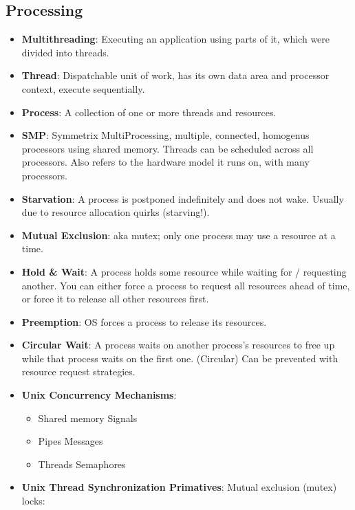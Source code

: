 \documentclass[fontsize=5pt]{scrartcl}
\begin{document}
\begin{multicols}{3}
     \subsection{Processing}
      \begin{itemize}       
       \item \textbf{Multithreading}: Executing an application using parts of it, which were divided into threads. 
       \item \textbf{Thread}: Dispatchable unit of work, has its own data area and processor context, execute sequentially.
       \item \textbf{Process}: A collection of one or more threads and resources.
       \item \textbf{SMP}: Symmetrix MultiProcessing, multiple, connected, homogenus processors using shared memory.
                           Threads can be scheduled across all processors. Also refers to the hardware model it runs on, with
                           many processors.
        \item \textbf{Starvation}: A process is postponed indefinitely and does not wake. Usually due to resource allocation quirks (starving!).
        \item \textbf{Mutual Exclusion}: aka mutex; only one process may use a resource at a time.
        \item \textbf{Hold \& Wait}: A process holds some resource while waiting for / requesting another. You can either force a process to request all resources ahead of time,
                                    or force it to release all other resources first.
        \item \textbf{Preemption}: OS forces a process to release its resources. 
        \item \textbf{Circular Wait}: A process waits on another process's resources to free up while that process waits on the first one. (Circular)
                                      Can be prevented with resource request strategies.
        \item \textbf{Unix Concurrency Mechanisms}:
        \begin{itemize}
          \item Shared memory   Signals
          \item Pipes           Messages
          \item Threads         Semaphores
        \end{itemize}
        \item \textbf{Unix Thread Synchronization Primatives}: Mutual exclusion (mutex) locks:

\end{itemize}
\end{multicols}
\end{document}
